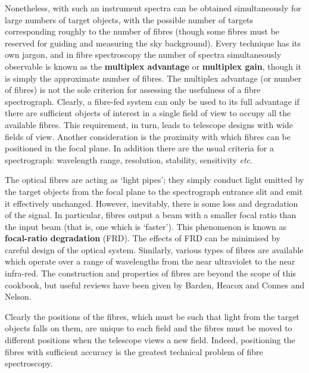 \documentclass[chapters,twoside,11pt]{starlink}
\begin{document}
Nonetheless, with such an instrument spectra can be obtained
simultaneously for large numbers of target objects, with the possible number
of targets corresponding roughly to the number of fibres (though some
fibres must be reserved for guiding and measuring the sky background).
Every technique has its own jargon, and in fibre spectroscopy the number
of spectra simultaneously observable is known as the \textbf{multiplex
advantage} or \textbf{multiplex gain}, though it is simply the approximate
number of fibres.  The multiplex advantage (or number of fibres) is not
the sole criterion for assessing the usefulness of a fibre spectrograph.
Clearly, a fibre-fed system can only be used to its full advantage if
there are sufficient objects of interest in a single field of view to
occupy all the available fibres.  This requirement, in turn, leads to
telescope designs with wide fields of view.  Another consideration is
the proximity with which fibres can be positioned in the focal plane.
In addition there are the usual criteria for a spectrograph: wavelength
range, resolution, stability, sensitivity \emph{etc}.

The optical fibres are acting as `light pipes'; they simply conduct
light emitted by the target objects from the focal plane to the
spectrograph entrance slit and emit it effectively unchanged.  However,
inevitably, there is some loss and degradation of the signal.  In
particular, fibres output a beam with a smaller focal ratio than the
input beam (that is, one which is `faster').  This phenomenon is known
as \textbf{focal-ratio degradation} (FRD).  The effects of FRD can be
minimised by careful design of the optical system.  Similarly, various
types of fibres are available which operate over a range of wavelengths
from the near ultraviolet to the near infra-red.  The construction and
properties of fibres are beyond the scope of this cookbook, but useful
reviews have been given by Barden\cite{BARDEN98}, Heacox and
Connes\cite{HEACOX92} and Nelson\cite{NELSON88}.

Clearly the positions of the fibres, which must be such that light
from the target objects falls on them, are unique to each field and
the fibres must be moved to different positions when the telescope
views a new field.  Indeed, positioning the fibres with sufficient
accuracy is the greatest technical problem of fibre spectroscopy.
\end{document}
